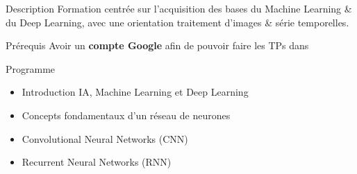 \begin{frame}{Description}
  Formation centrée sur l'acquisition des bases du Machine Learning \& du Deep Learning, avec une orientation traitement d'images \& série temporelles.
\end{frame}

\begin{frame}{Prérequis}
  Avoir un \textbf{compte Google} afin de pouvoir faire les TPs dans 
\end{frame}

\begin{frame}{Programme}
  \begin{itemize}
    \item Introduction IA, Machine Learning et Deep Learning
    \item Concepts fondamentaux d'un réseau de neurones
    \item Convolutional Neural Networks (CNN)
    \item Recurrent Neural Networks (RNN)
  \end{itemize}
\end{frame}

